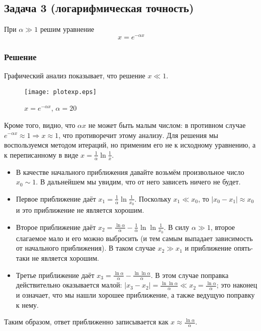 \documentclass[a4paper,12pt]{article}
\begin{document}
\subsection*{Задача 3 (логарифмическая точность)}

При $\alpha\gg 1$ решим уравнение 
\[
x=e^{-\alpha x}
\]

\subsubsection*{Решение}

\noindent
Графический анализ показывает, что решение $x\ll1$.

\begin{figure}[h]
	\caption{$x=e^{-\alpha x}$, $\alpha=20$}
	\centering
	\texttt{[image: plotexp.eps]}
\end{figure}

\noindent
Кроме того, видно,
что $\alpha x$ не может быть малым числом: в противном случае $e^{-\alpha x}\approx1\Rightarrow x\approx1$,
что противоречит этому анализу. Для решения мы воспользуемся методом
итераций, но применим его не к исходному уравнению, а к переписанному
в виде $x=\frac{1}{\alpha}\ln\frac{1}{x}$. 
\begin{itemize}
	\item В качестве начального приближения давайте возьмём произвольное число
	$x_{0}\sim1$. В дальнейшем мы увидим, что от него зависеть ничего
	не будет.
	\item Первое приближение даёт $x_{1}=\frac{1}{\alpha}\ln\frac{1}{x_{0}}$.
	Поскольку $x_{1}\ll x_{0}$, то $\left|x_{0}-x_{1}\right|\approx x_{0}$
	и это приближение не является хорошим.
	\item Второе приближение даёт $x_{2}=\frac{\ln\alpha}{\alpha}-\frac{1}{\alpha}\ln\ln\frac{1}{x_{0}}$.
	В силу $\alpha\gg1$, второе слагаемое мало и его можно выбросить
	(и тем самым выпадает зависимость от начального приближения). В таком
	случае $x_{2}\gg x_{1}$ и приближение опять-таки не является хорошим.
	\item Третье приближение даёт $x_{3}=\frac{\ln\alpha}{\alpha}-\frac{\ln\ln\alpha}{\alpha}$.
	В этом случае поправка действительно оказывается малой: $\left|x_{3}-x_{2}\right|=\frac{\ln\ln\alpha}{\alpha}\ll x_{2}=\frac{\ln\alpha}{\alpha}$;
	это наконец и означает, что мы нашли хорошее приближение, а также
	ведущую поправку к нему.
\end{itemize}
Таким образом, ответ приближенно записывается как $x\approx\frac{\ln\alpha}{\alpha}$.
\end{document}
